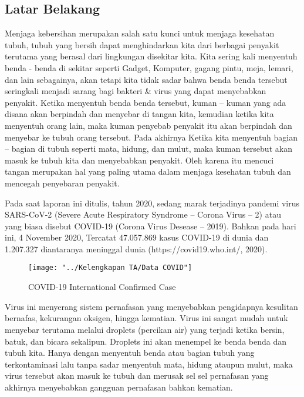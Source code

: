 \documentclass[a4paper]{article}
\begin{document}
		\subsection {Latar Belakang}
			\hspace{11mm}Menjaga kebersihan merupakan salah satu kunci untuk menjaga kesehatan tubuh, tubuh yang bersih dapat menghindarkan kita dari berbagai penyakit terutama yang berasal dari lingkungan disekitar kita. Kita sering kali menyentuh benda - benda di sekitar seperti Gadget, Komputer, gagang pintu, meja, lemari, dan lain sebagainya, akan tetapi kita tidak sadar bahwa benda benda tersebut seringkali menjadi sarang bagi bakteri \& virus yang dapat menyebabkan penyakit. Ketika menyentuh benda benda tersebut, kuman – kuman yang ada disana akan berpindah dan menyebar di tangan kita, kemudian ketika kita menyentuh orang lain, maka kuman penyebab penyakit itu akan berpindah dan menyebar ke tubuh orang tersebut. Pada akhirnya Ketika kita menyentuh bagian – bagian di tubuh seperti mata, hidung, dan mulut, maka kuman tersebut akan masuk ke tubuh kita dan menyebabkan penyakit. Oleh karena itu mencuci tangan merupakan hal yang paling utama dalam menjaga kesehatan tubuh dan mencegah penyebaran penyakit.
			
			\hspace{6mm}Pada saat laporan ini ditulis, tahun 2020, sedang marak terjadinya pandemi virus SARS-CoV-2 (Severe Acute Respiratory Syndrome – Corona Virus – 2) atau yang biasa disebut COVID-19 (Corona Virus Desease – 2019).  Bahkan pada hari ini, 4 November 2020, Tercatat 47.057.869 kasus COVID-19 di dunia dan 1.207.327 diantaranya meninggal dunia (https://covid19.who.int/, 2020).
	
			\begin{figure}[h]
				\centering
				\texttt{[image: "../Kelengkapan TA/Data COVID"]}
				\caption{COVID-19 International Confirmed Case }
				\label{fig:data-covid}
			\end{figure}

			\hspace{6mm}Virus ini menyerang sistem pernafasan yang menyebabkan pengidapnya kesulitan bernafas, kekurangan oksigen, hingga kematian. Virus ini sangat mudah untuk menyebar terutama melalui droplets (percikan air) yang terjadi ketika bersin, batuk, dan bicara sekalipun. Droplets ini akan menempel ke benda benda dan tubuh kita. Hanya dengan menyentuh benda atau bagian tubuh yang terkontaminasi lalu tanpa sadar menyentuh mata, hidung ataupun mulut, maka virus tersebut akan masuk ke tubuh dan merusak sel sel pernafasan yang akhirnya menyebabkan gangguan pernafasan bahkan kematian. 
			
\end{document}
